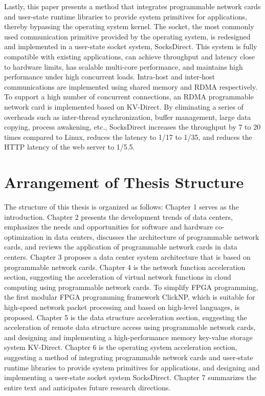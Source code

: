 Lastly, this paper presents a method that integrates programmable network cards and user-state runtime libraries to provide system primitives for applications, thereby bypassing the operating system kernel. The socket, the most commonly used communication primitive provided by the operating system, is redesigned and implemented in a user-state socket system, SocksDirect. This system is fully compatible with existing applications, can achieve throughput and latency close to hardware limits, has scalable multi-core performance, and maintains high performance under high concurrent loads. Intra-host and inter-host communications are implemented using shared memory and RDMA respectively. To support a high number of concurrent connections, an RDMA programmable network card is implemented based on KV-Direct. By eliminating a series of overheads such as inter-thread synchronization, buffer management, large data copying, process awakening, etc., SocksDirect increases the throughput by 7 to 20 times compared to Linux, reduces the latency to 1/17 to 1/35, and reduces the HTTP latency of the web server to 1/5.5.

\section{Arrangement of Thesis Structure}

The structure of this thesis is organized as follows:
Chapter 1 serves as the introduction.
Chapter 2 presents the development trends of data centers, emphasizes the needs and opportunities for software and hardware co-optimization in data centers, discusses the architecture of programmable network cards, and reviews the application of programmable network cards in data centers.
Chapter 3 proposes a data center system architecture that is based on programmable network cards.
Chapter 4 is the network function acceleration section, suggesting the acceleration of virtual network functions in cloud computing using programmable network cards. To simplify FPGA programming, the first modular FPGA programming framework ClickNP, which is suitable for high-speed network packet processing and based on high-level languages, is proposed.
Chapter 5 is the data structure acceleration section, suggesting the acceleration of remote data structure access using programmable network cards, and designing and implementing a high-performance memory key-value storage system KV-Direct.
Chapter 6 is the operating system acceleration section, suggesting a method of integrating programmable network cards and user-state runtime libraries to provide system primitives for applications, and designing and implementing a user-state socket system SocksDirect.
Chapter 7 summarizes the entire text and anticipates future research directions.
